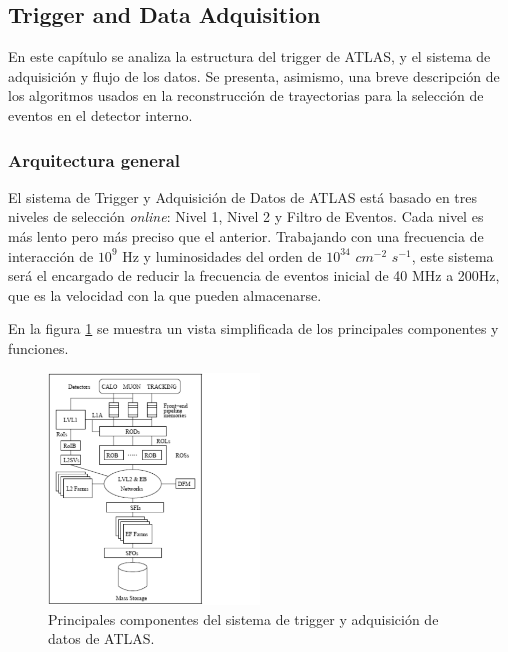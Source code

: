 \subsection{Trigger and Data Adquisition}\label{sec:atlasCALO}
 En este cap\'itulo se analiza la estructura del trigger de ATLAS, y el sistema de adquisici\'on y flujo de los datos. Se presenta, asimismo, una breve descripci\'on de los algoritmos usados en la reconstrucci\'on de trayectorias para la selecci\'on de eventos en el detector interno. 


\subsubsection{Arquitectura general}

   El sistema de Trigger y Adquisici\'on de Datos\cite{TDRtdaq} de ATLAS est\'a basado en tres niveles de selecci\'on \emph{online}: Nivel 1, Nivel 2 y Filtro de Eventos. Cada nivel es m\'as lento pero m\'as preciso que el anterior. Trabajando con una frecuencia de interacci\'on de $10^{9}$ Hz y luminosidades del orden de $10^{34}$ $cm^{-2}$ $s^{-1}$, este sistema ser\'a el encargado de reducir la frecuencia de eventos inicial de 40 MHz a 200Hz, que es la velocidad con la que pueden almacenarse. 

   En la figura \ref{fig:TDAQ} se muestra un vista simplificada de los principales componentes y funciones.  

\begin{figure}[!h]
\begin{center}
\includegraphics[width=0.5\textwidth]{Fig3/paint_TDAQ.pdf}
\caption{Principales componentes del sistema de trigger y adquisici\'on de datos de ATLAS. } 
\label{fig:TDAQ}
\end{center}
\end{figure}

